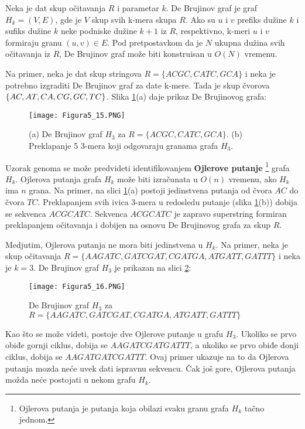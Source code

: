 \documentclass[12pt,oneside]{memoir}
\begin{document}
Neka je dat skup očitavanja $R$ i parametar $k$. De Brujinov graf je graf $H_k = (V, E)$, gde je $V$ skup svih k-mera skupa $R$. Ako su $u$ i $v$ prefiks dužine $k$ i sufiks dužine $k$ neke podniske dužine $k + 1$ iz $R$, respektivno, k-meri $u$ i $v$ formiraju granu $(u, v) \in E$. Pod pretpostavkom da je $N$ ukupna dužina svih očitavanja iz $R$, De Brujinov graf može biti konstruisan u $O(N)$ vremenu.

Na primer, neka je dat skup stringova $R = \{ACGC, CATC, GCA\}$ i neka je potrebno izgraditi De Brujinov graf za date k-mere. Tada je skup čvorova $\{AC, AT, \\ CA, CG, GC, TC\}$. Slika \ref{fig:9}(a) daje prikaz De Brujinovog grafa:

\begin{figure}[!ht]
\centering
\texttt{[image: Figura5\_15.PNG]}
\caption{(a) De Brujinov graf $H_3$ za $R = \{ACGC, CATC, GCA\}$. (b)
 Preklapanje 5 3-mera koji odgovaraju granama grafa $H_3$.}
 \label{fig:9}
 \end{figure}

Uzorak genoma se može predvideti identifikovanjem \textbf{Ojlerove putanje} \footnote{Ojlerova putanja je putanja koja obilazi svaku granu grafa $H_k$ tačno jednom.} grafa $H_k$. Ojlerova putanja grafa $H_k$ može biti izračunata u $O(n)$ vremenu, ako $H_k$ ima $n$ grana. Na primer, na slici \ref{fig:9}(a) postoji jedinstvena putanja od čvora $AC$ do čvora $TC$. Preklapanjem svih ivica 3-mera u redosledu putanje (slika \ref{fig:9}(b)) dobija se sekvenca $ACGCATC$. Sekvenca $ACGCATC$ je zapravo superstring formiran preklapanjem očitavanja i dobijen na osnovu De Brujinovog grafa za skup $R$.

Medjutim, Ojlerova putanja ne mora biti jedinstvena u $H_k$. Na primer, neka je skup očitavanja $R = \{AAGATC, GATCGAT, CGATGA, ATGATT, GATTT\}$ i neka je $k = 3$. De Brujinov graf $H_3$ je prikazan na slici  \ref{fig:10}: 

\begin{figure}[!ht]
\centering
\texttt{[image: Figura5\_16.PNG]}
\caption{De Brujinov graf $H_3$ za $R = \{AAGATC, GATCGAT, CGATGA, ATGATT, GATTT\}$ }
\label{fig:10}
\end{figure}

Kao što se može videti, postoje dve Ojlerove putanje u grafu $H_3$. Ukoliko se prvo obiđe gornji ciklus, dobija se $AAGATCGATGATTT$, a ukoliko se prvo obiđe donji ciklus, dobija se $AAGATGATCGATTT$. Ovaj primer ukazuje na to da Ojlerova putanja mozda neće uvek dati ispravnu sekvencu. Čak još gore, Ojlerova putanja možda neće postojati u nekom grafu $H_k$.
\end{document}
